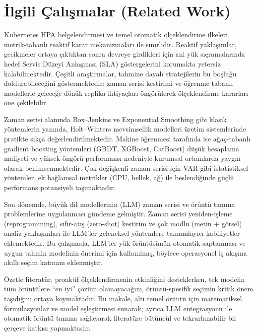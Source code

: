 \section{İlgili Çalışmalar (Related Work)}

Kubernetes HPA belgelendirmesi ve temel otomatik ölçeklendirme ilkeleri, metrik-tabanlı reaktif karar mekanizmaları ile sınırlıdır. Reaktif yaklaşımlar, gecikmeler ortaya çıktıktan sonra devreye girdikleri için ani yük sıçramalarında hedef Servis Düzeyi Anlaşması (SLA) göstergelerini korumakta yetersiz kalabilmektedir. Çeşitli araştırmalar, tahmine dayalı stratejilerin bu boşluğu doldurabileceğini göstermektedir: zaman serisi kestirimi ve öğrenme tabanlı modellerle geleceğe dönük replika ihtiyaçları öngörülerek ölçeklendirme kararları öne çekilebilir.

Zaman serisi alanında Box–Jenkins ve Exponential Smoothing gibi klasik yöntemlerin yanında, Holt–Winters mevsimsellik modelleri üretim sistemlerinde pratikte sıkça değerlendirilmektedir. Makine öğrenmesi tarafında ise ağaç-tabanlı gradient boosting yöntemleri (GBDT, XGBoost, CatBoost) düşük hesaplama maliyeti ve yüksek öngörü performansı nedeniyle kurumsal ortamlarda yaygın olarak benimsenmektedir. Çok değişkenli zaman serisi için VAR gibi istatistiksel yöntemler, ek bağlamsal metrikler (CPU, bellek, ağ) ile beslendiğinde güçlü performans potansiyeli taşımaktadır.

Son dönemde, büyük dil modellerinin (LLM) zaman serisi ve örüntü tanıma problemlerine uygulanması gündeme gelmiştir. Zaman serisi yeniden-işleme (reprogramming), sıfır-atış (zero-shot) kestirim ve çok modlu (metin + görsel) analiz yaklaşımları ile LLM’ler geleneksel yöntemlere tamamlayıcı kabiliyetler eklemektedir. Bu çalışmada, LLM’ler yük örüntüsünün otomatik saptanması ve uygun tahmin modelinin önerimi için kullanılmış, böylece operasyonel iş akışına akıllı seçim katmanı eklenmiştir.

Özetle literatür, proaktif ölçeklendirmenin etkinliğini desteklerken, tek modelin tüm örüntülere “en iyi” çözüm olamayacağını, örüntü-spesifik seçimin kritik önem taşıdığını ortaya koymaktadır. Bu makale, altı temel örüntü için matematiksel formülasyonlar ve model eşleştirmesi sunarak; ayrıca LLM entegrasyonu ile otomatik örüntü tanıma sağlayarak literatüre bütüncül ve tekrarlanabilir bir çerçeve katkısı yapmaktadır.

